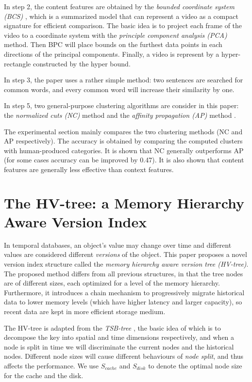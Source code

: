 \documentclass[paper=a4, fontsize=18pt]{article} %
\numberwithin{equation}{section} %
\numberwithin{figure}{section} %
\numberwithin{table}{section} %
\begin{document}
In step 2, the content features are obtained by the \emph{bounded coordinate system (BCS)} \cite{HSSZC09}, which is a summarized model that can represent a video as a compact signature for efficient comparison. The basic idea is to project each frame of the video to a coordinate system with the \emph{principle component analysis (PCA)} method. Then BPC will place bounds on the furthest data points in each directions of the principal components. Finally, a video is represent by a hyper-rectangle constructed by the hyper bound.

In step 3, the paper uses a rather simple method: two sentences are searched for common words, and every common word will increase their similarity by one.

In step 5, two general-purpose clustering algorithms are consider in this paper: the \emph{normalized cuts (NC)} method \cite{SM00} and the \emph{affinity propagation (AP)} method \cite{FD07}.

The experimental section mainly compares the two clustering methods (NC and AP respectively). The accuracy is obtained by comparing the computed clusters with human-produced categories. It is shown that NC generally outperforms AP (for some cases accuracy can be improved by 0.47). It is also shown that content features are generally less effective than context features.

\section{The HV-tree: a Memory Hierarchy Aware Version Index \cite{ZS10}}

In temporal databases, an object's value may change over time and different values are considered different \emph{versions} of the object. This paper proposes a novel version index structure called the \emph{memory hierarchy aware version tree (HV-tree)}. The proposed method differs from all previous structures, in that the tree nodes are of different sizes, each optimized for a level of the memory hierarchy. Furthermore, it introduces a chain mechanism to progressively migrate historical data to lower memory levels (which have higher latency and larger capacity), so recent data are kept in more efficient storage medium.

The HV-tree is adapted from the \emph{TSB-tree} \cite{LS89}, the basic idea of which is to decompose the key into spatial and time dimensions respectively, and when a node is split in time we will discriminate the current nodes and the historical nodes.
Different node sizes will cause different behaviours of \emph{node split}, and thus affects the performance. We use $S_{cache}$ and $S_{disk}$ to denote the optimal node size for the cache and the disk.
\end{document}
